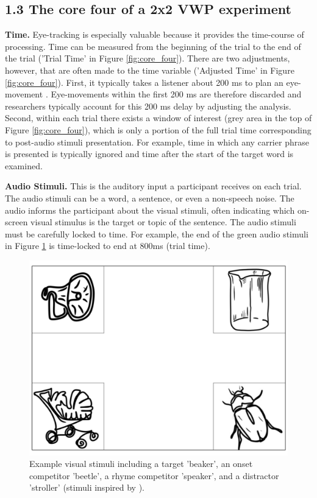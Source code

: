 \subsection{1.3 The core four of a 2x2 VWP experiment}

\textbf{Time.} Eye-tracking is especially valuable because it provides the time-course of processing. Time can be measured from the beginning of the trial to the end of the trial ('Trial Time' in Figure \ref{fig:core_four}). There are two adjustments, however, that are often made to the time variable ('Adjusted Time'  in Figure \ref{fig:core_four}). First, it typically takes a listener about 200 ms to plan an eye-movement \parencite[][]{Matin_Shao_Boff_1993}. Eye-movements within the first 200 ms are therefore discarded and researchers typically account for this 200 ms delay by adjusting the analysis. Second, within each trial there exists a window of interest (grey area in the top of Figure \ref{fig:core_four}), which is only a portion of the full trial time corresponding to post-audio stimuli presentation. For example, time in which any carrier phrase is presented is typically ignored and time after the start of the target word is examined.

\textbf{Audio Stimuli.} This is the auditory input a participant receives on each trial. The audio stimuli can be a word, a sentence, or even a non-speech noise. The audio informs the participant about the visual stimuli, often indicating which on-screen visual stimulus is the target or topic of the sentence. The audio stimuli must be carefully locked to time. For example, the end of the green audio stimuli in Figure \ref{fig:Visual_stimuli.png} is time-locked to end at 800ms (trial time).

\begin{figure}[h]
    \centering
    \includegraphics[scale=.35]{figures/Visual_stimuli.png}
    \caption{Example visual stimuli including a target 'beaker', an onset competitor 'beetle', a rhyme competitor 'speaker', and a distractor 'stroller' (stimuli inspired by \textcite[][]{Allopenna_1998}{}{}). }
    \label{fig:Visual_stimuli.png}
\end{figure}

